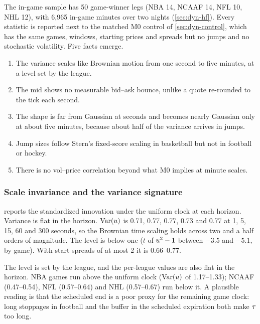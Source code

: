 
The in-game sample has 50 game-winner legs (NBA 14, NCAAF 14, NFL 10, NHL 12), with 6{,}965
in-game minutes over two nights (\cref{sec:dyn-hf}). %
Every statistic is reported next to the matched M0 control of \cref{sec:dyn-control}, which has the
same games, windows, starting prices and spreads but no jumps and no stochastic volatility. Five
facts emerge.
\begin{enumerate}
\item The variance scales like Brownian motion from one second to five minutes, at a level set by
  the league.
\item The mid shows no measurable bid--ask bounce, unlike a quote re-rounded to the tick each
  second.
\item The shape is far from Gaussian at seconds and becomes nearly Gaussian only at about five
  minutes, because about half of the variance arrives in jumps.
\item Jump sizes follow Stern's fixed-score scaling in basketball but not in football or hockey.
\item There is no vol--price correlation beyond what M0 implies at minute scales.
\end{enumerate}

\subsubsection{Scale invariance and the variance signature}\label{sec:dyn-res-hf-scale}

 reports the standardized innovation under the uniform clock at each horizon.
Variance is flat in the horizon. $\operatorname{Var}(u)$ is 0.71, 0.77, 0.77, 0.73 and 0.77 at
  1, 5, 15, 60 and 300 seconds, so the Brownian time scaling holds across two and a half orders of
  magnitude. The level is below one ($t$ of $u^2-1$ between $-3.5$ and $-5.1$, by game). With
  start spreads of at most 2\cents{} it is 0.66--0.77.

The level is set by the league, and the per-league values are also flat in the
  horizon. NBA games run above the uniform clock ($\operatorname{Var}(u)$ of 1.17--1.33); NCAAF (0.47--0.54),
  NFL (0.57--0.64) and NHL (0.57--0.67) run below it. A plausible reading is that the scheduled end
  is a poor proxy for the remaining game clock: long stoppages in football and the buffer in the
  scheduled expiration both make $\tau$ too long.

